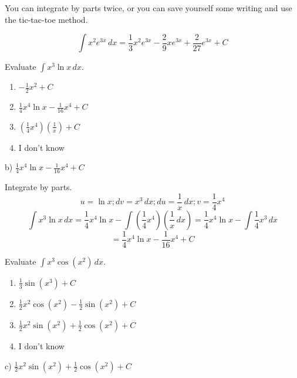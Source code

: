 \documentclass[addpoints,12pt,answers]{exam}
\begin{document}
\begin{questions}
\begin{solution}
    You can integrate by parts twice, or you can save yourself some writing and use the tic-tac-toe method.
    \begin{center}
    \end{center}
    $$\int x^2 e^{3x}\,dx=\frac{1}{3}x^2 e^{3x}-\frac{2}{9}x e^{3x}+\frac{2}{27}e^{3x}+C$$
  \end{solution}
  \newpage
  \question
  Evaluate $\displaystyle\int x^3\ln x\,dx$.
  \begin{enumerate}[label=\alph*)]
    \item
    $\displaystyle-\frac{1}{2}x^2+C$
    \item
    $\displaystyle\frac{1}{4}x^4\ln x-\frac{1}{16}x^4+C$    
    \item
    $\displaystyle\left(\frac{1}{4}x^4\right)\left(\frac{1}{x}\right)+C$
    \item
    I don't know
  \end{enumerate}
  \begin{solution}
    b) $\displaystyle\frac{1}{4}x^4\ln x-\frac{1}{16}x^4+C$
    
    Integrate by parts.
    $$u=\ln x; dv=x^3\,dx; du=\frac{1}{x}\,dx; v=\frac{1}{4}x^4$$
    $$\int x^3\ln x\,dx=\frac{1}{4}x^4\ln x-\int\left(\frac{1}{4}x^4\right)\left(\frac{1}{x}\,dx\right)=\frac{1}{4}x^4\ln x-\int\frac{1}{4}x^3\,dx$$
    $$=\frac{1}{4}x^4\ln x-\frac{1}{16}x^4+C$$
  \end{solution}
  \newpage
  \question
  Evaluate $\displaystyle\int x^3\cos(x^2)\,dx$.
  \begin{enumerate}[label=\alph*)]
    \item
    $\displaystyle\frac{1}{3}\sin(x^3)+C$
    \item
    $\displaystyle\frac{1}{2}x^2\cos(x^2)-\frac{1}{2}\sin(x^2)+C$
    \item
    $\displaystyle\frac{1}{2}x^2\sin(x^2)+\frac{1}{2}\cos(x^2)+C$
    \item
    I don't know
  \end{enumerate}
  \begin{solution}
    c) $\displaystyle\frac{1}{2}x^2\sin(x^2)+\frac{1}{2}\cos(x^2)+C$
    

\end{solution}
\end{questions}
\end{document}
